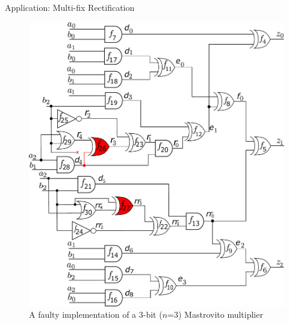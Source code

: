 \begin{frame}{\large Application: Multi-fix Rectification}
\begin{figure}[hbt]
\centering
\includegraphics[scale=0.24]{mas_3_ddc_mfr_a.pdf}
\caption*{A faulty implementation of a 3-bit ($n$=3) Mastrovito multiplier
}
\end{figure}
\end{frame}

